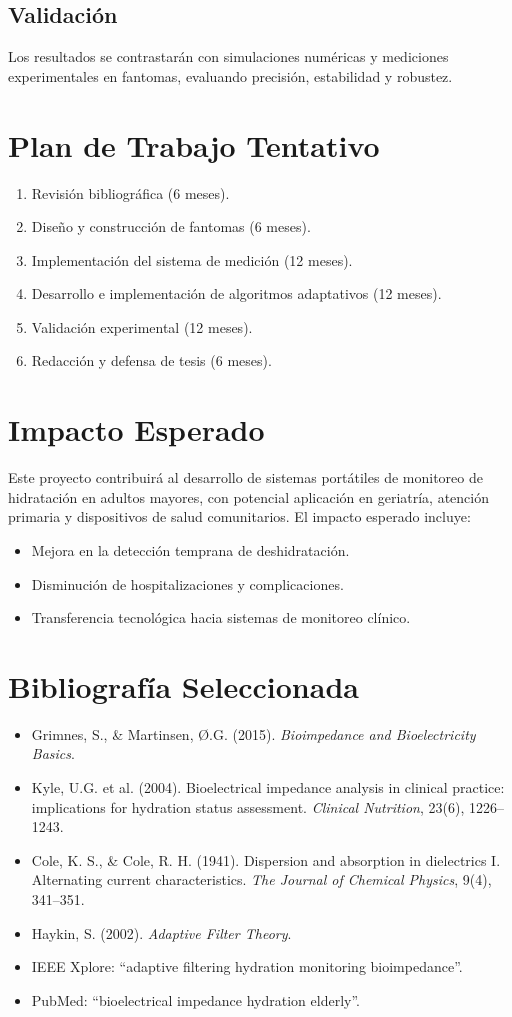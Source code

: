 \documentclass[12pt,a4paper]{article}
\begin{document}
\subsection{Validación}
Los resultados se contrastarán con simulaciones numéricas y mediciones experimentales en fantomas, evaluando precisión, estabilidad y robustez.

\section{Plan de Trabajo Tentativo}
\begin{enumerate}
    \item Revisión bibliográfica (6 meses).
    \item Diseño y construcción de fantomas (6 meses).
    \item Implementación del sistema de medición (12 meses).
    \item Desarrollo e implementación de algoritmos adaptativos (12 meses).
    \item Validación experimental (12 meses).
    \item Redacción y defensa de tesis (6 meses).
\end{enumerate}

\section{Impacto Esperado}
Este proyecto contribuirá al desarrollo de sistemas portátiles de monitoreo de hidratación en adultos mayores, con potencial aplicación en geriatría, atención primaria y dispositivos de salud comunitarios. El impacto esperado incluye:
\begin{itemize}
    \item Mejora en la detección temprana de deshidratación.
    \item Disminución de hospitalizaciones y complicaciones.
    \item Transferencia tecnológica hacia sistemas de monitoreo clínico.
\end{itemize}

\section{Bibliografía Seleccionada}
\begin{itemize}
    \item Grimnes, S., \& Martinsen, Ø.G. (2015). \textit{Bioimpedance and Bioelectricity Basics}.
    \item Kyle, U.G. et al. (2004). Bioelectrical impedance analysis in clinical practice: implications for hydration status assessment. \textit{Clinical Nutrition}, 23(6), 1226–1243.
    \item Cole, K. S., \& Cole, R. H. (1941). Dispersion and absorption in dielectrics I. Alternating current characteristics. \textit{The Journal of Chemical Physics}, 9(4), 341–351.
    \item Haykin, S. (2002). \textit{Adaptive Filter Theory}.
    \item IEEE Xplore: ``adaptive filtering hydration monitoring bioimpedance''.
    \item PubMed: ``bioelectrical impedance hydration elderly''.
\end{itemize}
\end{document}
